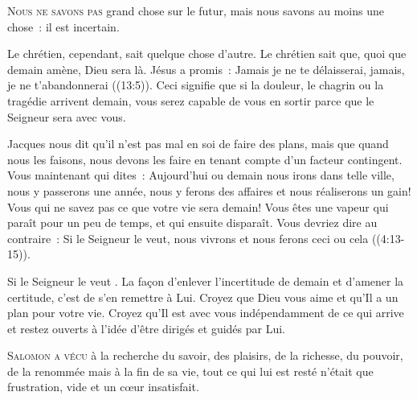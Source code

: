 

\lettrine{N}{ous ne savons pas} grand chose sur le futur,
 mais nous savons au moins une chose~: il est incertain. 

Le chrétien, cependant, sait quelque chose d'autre.
 Le chrétien sait que, quoi que demain amène, Dieu sera là.
 Jésus a promis~:
 \og Jamais je ne te délaisserai, jamais, je ne t'abandonnerai \fg{}
 ((13:5)).
 Ceci signifie que si la douleur, le chagrin ou la tragédie arrivent 
 demain, vous serez capable de vous en sortir
 parce que le Seigneur sera avec vous. 


Jacques nous dit qu'il n'est pas mal en soi de faire des plans,
 mais que quand nous les faisons, nous devons les faire en tenant compte
 d'un facteur contingent.
 \og Vous maintenant qui dites~: Aujourd'hui ou demain nous irons
 dans telle ville, nous y passerons une année, nous y ferons des affaires
 et nous réaliserons un gain! Vous qui ne savez pas ce que votre vie
 sera demain! Vous êtes une vapeur qui paraît pour un peu de temps,
 et qui ensuite disparaît.
 Vous devriez dire au contraire~: Si le Seigneur le veut,
 nous vivrons et nous ferons ceci ou cela \fg{} ((4:13-15)). 

\og Si le Seigneur le veut \fg{}. La façon d'enlever l'incertitude de demain
 et d'amener la certitude, c'est de s'en remettre à Lui.
 Croyez que Dieu vous aime et qu'Il a un plan pour votre vie.
 Croyez qu'Il est avec vous indépendamment de ce qui arrive
 \ocadr et restez ouverts à l'idée d'être dirigés et guidés par Lui.

\dvrule






\lettrine{S}{alomon a vécu} à la recherche du savoir, des plaisirs,
 de la richesse, du pouvoir, de la renommée
 \ocadr mais à la fin de sa vie, tout ce qui lui est resté
 n'était que frustration, vide et un cœur insatisfait. 

